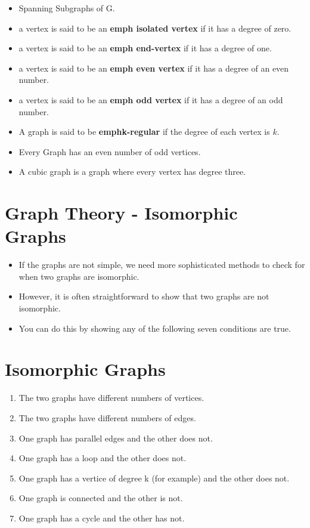 \documentclass[]{report}
\begin{document}
\begin{itemize}
\item Spanning Subgraphs of G.

\item a vertex is said to be an \textbf{emph{ isolated vertex}} if it has a degree of zero.
\item a vertex is said to be an \textbf{emph{ end-vertex}} if it has a degree of one.
\item a vertex is said to be an \textbf{emph{ even vertex}} if it has a degree of an even number.
\item a vertex is said to be an \textbf{emph{ odd vertex}} if it has a degree of an odd number.


\item A graph is said to be \textbf{emph{k-regular}} if the degree of each vertex is $k$. 
\item Every Graph has an even number of odd vertices.
\item A cubic graph is a graph where every vertex has degree three.
\end{itemize}
\section{Graph Theory - Isomorphic Graphs}

\begin{itemize}
\item If the graphs are not simple, we need more sophisticated methods to check for when two graphs are isomorphic. 
\item However, it is often straightforward to show that two graphs are not isomorphic. 
\item You can do this by showing any of the following seven conditions are true.
\end{itemize}


\section{Isomorphic Graphs}

\begin{enumerate}
\item The two graphs have different numbers of vertices.
\item The two graphs have different numbers of edges.
\item One graph has parallel edges and the other does not.
\item One graph has a loop and the other does not.
\item One graph has a vertice of degree k (for example) and the other does not.
\item One graph is connected and the other is not.
\item One graph has a cycle and the other has not.
\end{enumerate}
\end{document}
